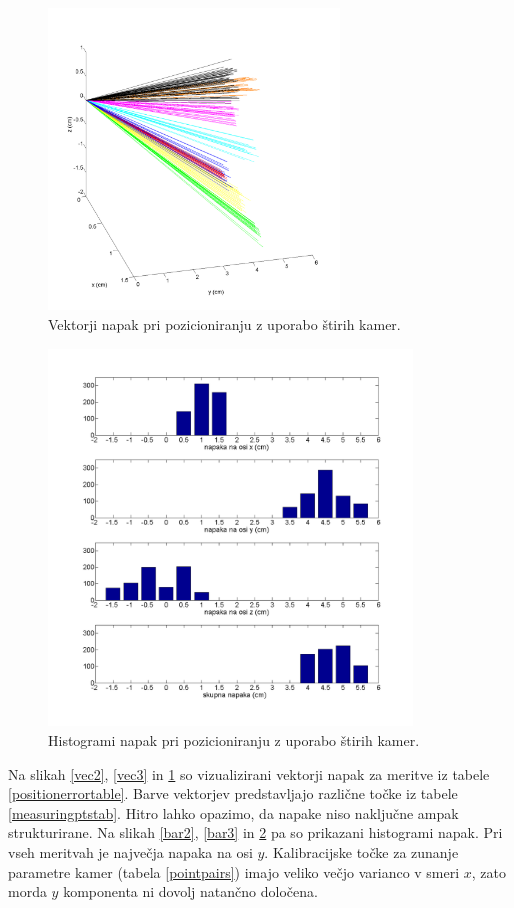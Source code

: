 \documentclass[a4paper, 12pt]{book}
\begin{document}
\begin{figure}
\centering
\includegraphics[height=8cm]{points4errplot.png}
\caption{Vektorji napak pri pozicioniranju z uporabo štirih kamer.}
\label{vec4}
\end{figure}
\begin{figure}
\centering
\includegraphics[height=10cm]{points4barplot.png}
\caption{Histogrami napak pri pozicioniranju z uporabo štirih kamer.}
\label{bar4}
\end{figure}


Na slikah \ref{vec2}, \ref{vec3} in \ref{vec4} so vizualizirani vektorji napak za meritve iz tabele \ref{positionerrortable}. Barve vektorjev predstavljajo različne točke iz tabele \ref{measuringptstab}. Hitro lahko opazimo, da napake niso naključne ampak strukturirane. Na slikah \ref{bar2}, \ref{bar3} in \ref{bar4} pa so prikazani histogrami napak. Pri vseh meritvah je največja napaka na osi $y$. Kalibracijske točke za zunanje parametre kamer (tabela \ref{pointpairs}) imajo veliko večjo varianco v smeri $x$, zato morda $y$ komponenta ni dovolj natančno določena.
\end{document}
